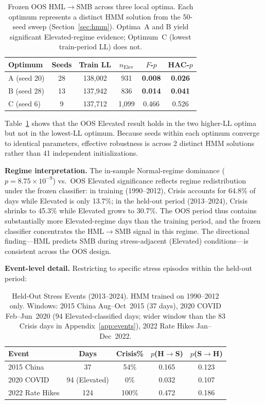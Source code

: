 \documentclass[sigconf,anonymous]{acmart}
\begin{document}
\begin{table}[t]
\centering
\caption{Frozen OOS HML$\to$SMB across three local optima.
Each optimum represents a distinct HMM solution from the 50-seed sweep
(Section~\ref{sec:hmm}). Optima~A and B yield significant Elevated-regime
evidence; Optimum~C (lowest train-period LL) does not.}
\label{tab:optima_oos}
\small
\begin{tabular}{@{}lccccc@{}}
\toprule
Optimum & Seeds & Train LL & $n_{\text{Elev}}$ & $F$-$p$ & HAC-$p$ \\
\midrule
A (seed 20) & 28 & 138{,}002 & 931 & \textbf{0.008} & \textbf{0.026} \\
B (seed 28) & 13 & 137{,}942 & 836 & \textbf{0.014} & \textbf{0.041} \\
C (seed 6)  &  9 & 137{,}712 & 1{,}099 & 0.466 & 0.526 \\
\bottomrule
\end{tabular}
\end{table}

Table~\ref{tab:optima_oos} shows that the OOS Elevated result holds in the two higher-LL optima but not in the lowest-LL optimum. Because seeds within each optimum converge to identical parameters, effective robustness is across 2 distinct HMM solutions rather than 41 independent initializations.

\textbf{Regime interpretation.} The in-sample Normal-regime dominance
($p = 8.75 \times 10^{-9}$) vs.\ OOS Elevated significance reflects
regime redistribution under the frozen classifier: in training (1990--2012),
Crisis accounts for 64.8\% of days while Elevated is only 13.7\%;
in the held-out period (2013--2024), Crisis shrinks to 45.3\% while
Elevated grows to 30.7\%. The OOS period thus contains substantially more
Elevated-regime days than the training period, and the frozen classifier
concentrates the HML$\to$SMB signal in this regime.
The directional finding---HML predicts SMB during stress-adjacent
(Elevated) conditions---is consistent across the OOS design.

\textbf{Event-level detail.} Restricting to specific stress episodes
within the held-out period:

\begin{table}[t]
\centering
\caption{Held-Out Stress Events (2013--2024). HMM trained on 1990--2012 only.
Windows: 2015 China Aug--Oct~2015 (37 days), 2020 COVID Feb--Jun~2020 (94 Elevated-classified days; wider window than the 83 Crisis days in Appendix~\ref{app:events}), 2022 Rate Hikes Jan--Dec~2022.}
\label{tab:frozen_events}
\scriptsize
\begin{tabular}{@{}lcccc@{}}
\toprule
Event & Days & Crisis\% & $p$(H$\to$S) & $p$(S$\to$H) \\
\midrule
2015 China & 37 & 54\% & 0.165 & 0.123 \\
2020 COVID & 94 (Elevated) & 0\% & 0.032 & 0.107 \\
2022 Rate Hikes & 124 & 100\% & 0.472 & 0.186 \\
\bottomrule
\end{tabular}
\end{table}
\end{document}
